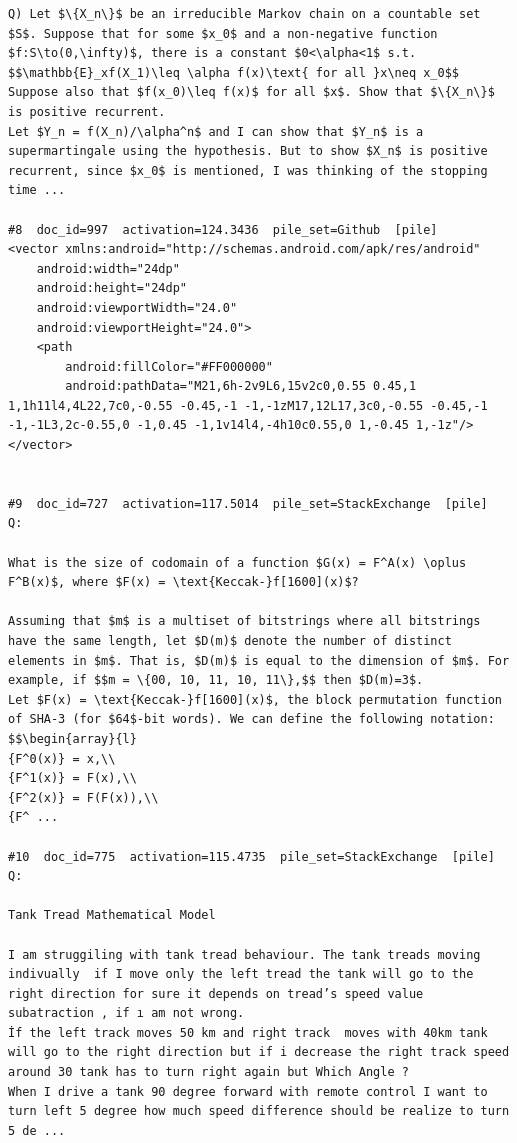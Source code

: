 \begin{verbatim}
Q) Let $\{X_n\}$ be an irreducible Markov chain on a countable set $S$. Suppose that for some $x_0$ and a non-negative function $f:S\to(0,\infty)$, there is a constant $0<\alpha<1$ s.t. 
$$\mathbb{E}_xf(X_1)\leq \alpha f(x)\text{ for all }x\neq x_0$$
Suppose also that $f(x_0)\leq f(x)$ for all $x$. Show that $\{X_n\}$ is positive recurrent.
Let $Y_n = f(X_n)/\alpha^n$ and I can show that $Y_n$ is a supermartingale using the hypothesis. But to show $X_n$ is positive recurrent, since $x_0$ is mentioned, I was thinking of the stopping time ...

#8  doc_id=997  activation=124.3436  pile_set=Github  [pile]
<vector xmlns:android="http://schemas.android.com/apk/res/android"
    android:width="24dp"
    android:height="24dp"
    android:viewportWidth="24.0"
    android:viewportHeight="24.0">
    <path
        android:fillColor="#FF000000"
        android:pathData="M21,6h-2v9L6,15v2c0,0.55 0.45,1 1,1h11l4,4L22,7c0,-0.55 -0.45,-1 -1,-1zM17,12L17,3c0,-0.55 -0.45,-1 -1,-1L3,2c-0.55,0 -1,0.45 -1,1v14l4,-4h10c0.55,0 1,-0.45 1,-1z"/>
</vector>


#9  doc_id=727  activation=117.5014  pile_set=StackExchange  [pile]
Q:

What is the size of codomain of a function $G(x) = F^A(x) \oplus F^B(x)$, where $F(x) = \text{Keccak-}f[1600](x)$?

Assuming that $m$ is a multiset of bitstrings where all bitstrings have the same length, let $D(m)$ denote the number of distinct elements in $m$. That is, $D(m)$ is equal to the dimension of $m$. For example, if $$m = \{00, 10, 11, 10, 11\},$$ then $D(m)=3$.  
Let $F(x) = \text{Keccak-}f[1600](x)$, the block permutation function of SHA-3 (for $64$-bit words). We can define the following notation: $$\begin{array}{l}
{F^0(x)} = x,\\
{F^1(x)} = F(x),\\
{F^2(x)} = F(F(x)),\\
{F^ ...

#10  doc_id=775  activation=115.4735  pile_set=StackExchange  [pile]
Q:

Tank Tread Mathematical Model

I am struggiling with tank tread behaviour. The tank treads moving indivually  if I move only the left tread the tank will go to the right direction for sure it depends on tread’s speed value subatraction , if ı am not wrong.
İf the left track moves 50 km and right track  moves with 40km tank will go to the right direction but if i decrease the right track speed around 30 tank has to turn right again but Which Angle ?
When I drive a tank 90 degree forward with remote control I want to turn left 5 degree how much speed difference should be realize to turn 5 de ...


\end{verbatim}
